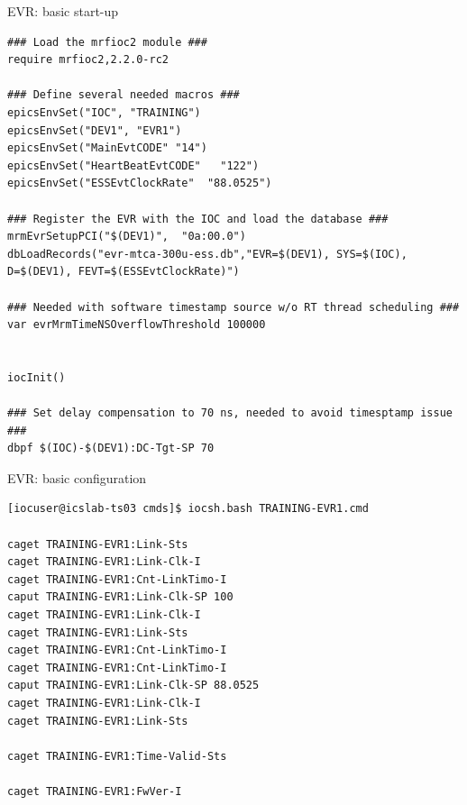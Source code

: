 \documentclass[
  9pt
  , table
  , ignorenonframetext
]{beamer}
\begin{document}

\begin{frame}[fragile]{EVR: basic start-up}
\begin{lstlisting}[style=termstyle,breaklines=true,basicstyle=\scriptsize]
### Load the mrfioc2 module ###
require mrfioc2,2.2.0-rc2

### Define several needed macros ###
epicsEnvSet("IOC", "TRAINING")
epicsEnvSet("DEV1", "EVR1")
epicsEnvSet("MainEvtCODE" "14")
epicsEnvSet("HeartBeatEvtCODE"   "122")
epicsEnvSet("ESSEvtClockRate"  "88.0525")

### Register the EVR with the IOC and load the database ###
mrmEvrSetupPCI("$(DEV1)",  "0a:00.0")
dbLoadRecords("evr-mtca-300u-ess.db","EVR=$(DEV1), SYS=$(IOC), D=$(DEV1), FEVT=$(ESSEvtClockRate)")

### Needed with software timestamp source w/o RT thread scheduling ###
var evrMrmTimeNSOverflowThreshold 100000


iocInit()

### Set delay compensation to 70 ns, needed to avoid timesptamp issue ###
dbpf $(IOC)-$(DEV1):DC-Tgt-SP 70

\end{lstlisting}
\end{frame}

\begin{frame}[fragile]{EVR: basic configuration}
\begin{lstlisting}[style=termstyle,breaklines=true,basicstyle=\scriptsize]
[iocuser@icslab-ts03 cmds]$ iocsh.bash TRAINING-EVR1.cmd

caget TRAINING-EVR1:Link-Sts
caget TRAINING-EVR1:Link-Clk-I
caget TRAINING-EVR1:Cnt-LinkTimo-I
caput TRAINING-EVR1:Link-Clk-SP 100
caget TRAINING-EVR1:Link-Clk-I
caget TRAINING-EVR1:Link-Sts
caget TRAINING-EVR1:Cnt-LinkTimo-I
caget TRAINING-EVR1:Cnt-LinkTimo-I
caput TRAINING-EVR1:Link-Clk-SP 88.0525
caget TRAINING-EVR1:Link-Clk-I
caget TRAINING-EVR1:Link-Sts

caget TRAINING-EVR1:Time-Valid-Sts

caget TRAINING-EVR1:FwVer-I

\end{lstlisting}
\end{frame}
\end{document}
